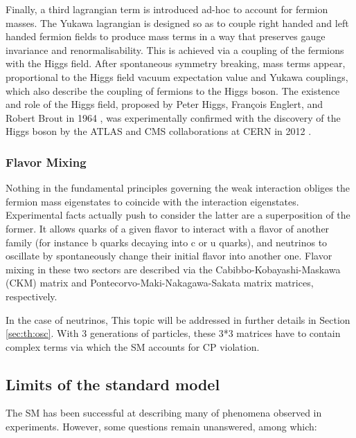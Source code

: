 Finally, a third lagrangian term is introduced ad-hoc to account for fermion masses. The Yukawa lagrangian is designed so as to couple right handed and left handed fermion fields to produce mass terms in a way that preserves gauge invariance and renormalisability. This is achieved via a coupling of the fermions with the Higgs field. After spontaneous symmetry breaking, mass terms appear, proportional to the Higgs field vacuum expectation value and Yukawa couplings, which also describe the coupling of fermions to the Higgs boson. The existence and role of the Higgs field, proposed by Peter Higgs, François Englert, and Robert Brout in 1964 \cite{englert_broken_1964, higgs_broken_1964, higgs_broken_1964-1, guralnik_global_1964}, was experimentally confirmed with the discovery of the Higgs boson by the ATLAS and CMS collaborations at CERN in 2012 \cite{aad_observation_2012, chatrchyan_observation_2012}.

\subsubsection{Flavor Mixing}

Nothing in the fundamental principles governing the weak interaction obliges the fermion mass eigenstates to coincide with the interaction eigenstates. Experimental facts actually push to consider the latter are a superposition of the former. It allows quarks of a given flavor to interact with a flavor of another family (for instance b quarks decaying into c or u quarks), and neutrinos to oscillate by spontaneously change their initial flavor into another one. Flavor mixing in these two sectors are described via the Cabibbo-Kobayashi-Maskawa (CKM) matrix \cite{kobayashi_cp-violation_1973} and Pontecorvo-Maki-Nakagawa-Sakata matrix \cite{maki_remarks_1962} matrices, respectively.

In the case of neutrinos, This topic will be addressed in further details in Section \ref{sec:th:osc}. With 3 generations of particles, these 3*3 matrices have to contain complex terms via which the SM accounts for CP violation.


\subsection{Limits of the standard model}

The SM has been successful at describing many of phenomena observed in experiments. However, some questions remain unanswered, among which:

